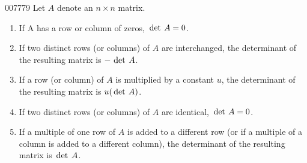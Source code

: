 \begin{theorem}{}{007779}
Let $A$ denote an $n \times n$ matrix.

\begin{enumerate}
\item If A has a row or column of zeros, $\thinspace\operatorname{det \medspace} A = 0$.
\item If two distinct rows (or columns) of $A$ are interchanged, the determinant of the resulting matrix is $- \thinspace\operatorname{det \medspace} A$.

\item If a row (or column) of $A$ is multiplied by a constant $u$, the determinant of the resulting matrix is $u(\thinspace\operatorname{det \medspace} A)$.

\item If two distinct rows (or columns) of $A$ are identical, $\thinspace\operatorname{det \medspace} A = 0$.

\item If
 a multiple of one row of $A$ is added to a different row (or if a 
multiple of a column is added to a different column), the determinant of
 the resulting matrix is $\thinspace\operatorname{det \medspace} A$.
\end{enumerate}
\end{theorem}

